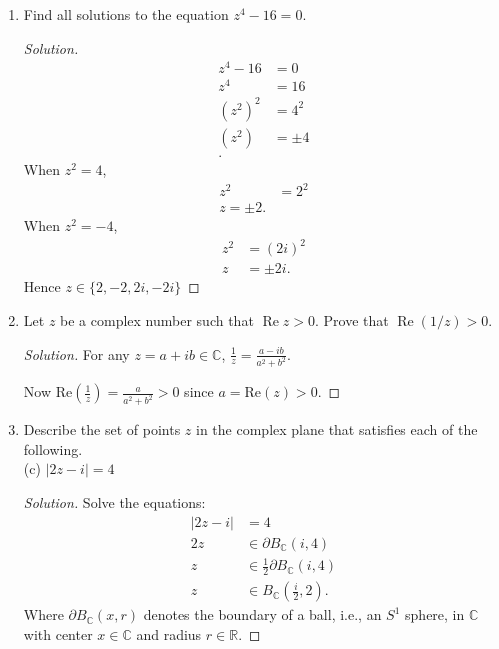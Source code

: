 \begin{enumerate}
(d) $z^{2}+16=0$
\begin{proof}[Solution]
\begin{align*}
	z^2 + 16 &= 0 \\
	z^2 &= -16 \\
	z^2 &= (4i)^2 \\
	z &= \pm 4i \\
.\end{align*}
\end{proof}
\item Find all solutions to the equation $z^{4}-16=0$.
\begin{proof}[Solution]
\begin{align*}
	z^4-16&=0\\
	z^4&=16\\
	(z^2)^2&=4^2\\
	(z^2)&=\pm 4\\
.\end{align*}
When $z^2 = 4$, 
\begin{align*}
	z^2 &= 2^2\\
	z = \pm 2
.\end{align*}
When $z^2 = -4 $,
\begin{align*}
	z^2 &= (2i)^2\\
	z &= \pm 2i
.\end{align*}
Hence $z \in \{2,-2,2i,-2i\} $
\end{proof}
\item Let $z$ be a complex number such that $\operatorname{Re} z>0$. Prove that $\operatorname{Re}(1 / z)>0$.
\begin{proof}[Solution]
For any $z = a + i b \in  \mathbb{C}$, 
$\frac{1}{z } = \frac{a-ib }{a^2+b^2}$.

Now $\text{Re}(\frac{1}{z }) = \frac{a}{a^2+b^2}> 0$ since $a = \text{Re}(z) > 0$.
\end{proof}
	\item Describe the set of points $z$ in the complex plane that satisfies each of the following.\\
(c) $|2 z-i|=4$
\begin{proof}[Solution]
	Solve the equations:
	\begin{align*}
		|2 z - i|&= 4\\
		2z &\in \partial B_\mathbb{C}(i, 4)\\
		z &\in \frac{1}{2}\partial B_\mathbb{C}(i, 4)\\
		z &\in B_\mathbb{C}(\frac{i}{2}, 2)
	.\end{align*}
	Where $\partial B_\mathbb{C}(x,r)$ denotes the boundary of a ball, i.e., an $S^1$ sphere, in $\mathbb{C}$ with center $x \in \mathbb{C}$ and radius $r \in  \mathbb{R}$.
\end{proof}


\end{enumerate}
